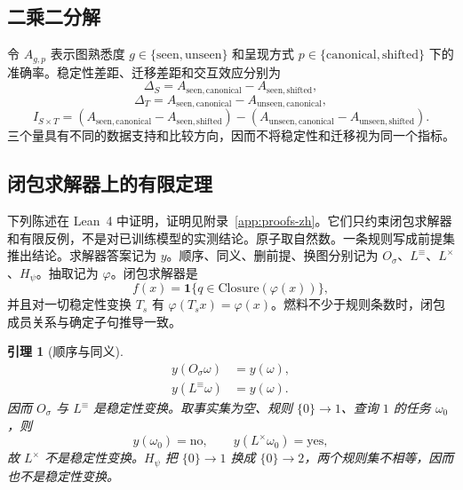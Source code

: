 \documentclass[UTF8,11pt,a4paper]{ctexart}
\theoremstyle{plain}
\newtheorem{lemma}[theorem]{引理}
\begin{document}
\subsection{二乘二分解}

令 $A_{g,p}$ 表示图熟悉度 $g\in\{\mathrm{seen},\mathrm{unseen}\}$ 和呈现方式 $p\in\{\mathrm{canonical},\mathrm{shifted}\}$ 下的准确率。稳定性差距、迁移差距和交互效应分别为
\begin{equation}
\Delta_S=A_{\mathrm{seen,canonical}}-A_{\mathrm{seen,shifted}},
\end{equation}
\begin{equation}
\Delta_T=A_{\mathrm{seen,canonical}}-A_{\mathrm{unseen,canonical}},
\end{equation}
\begin{equation}
I_{S\times T}=
\left(A_{\mathrm{seen,canonical}}-A_{\mathrm{seen,shifted}}\right)
-\left(A_{\mathrm{unseen,canonical}}-A_{\mathrm{unseen,shifted}}\right).
\end{equation}
三个量具有不同的数据支持和比较方向，因而不将稳定性和迁移视为同一个指标。

\subsection{闭包求解器上的有限定理}

下列陈述在 Lean~4 中证明，证明见附录~\ref{app:proofs-zh}。它们只约束闭包求解器和有限反例，不是对已训练模型的实测结论。原子取自然数。一条规则写成前提集推出结论。求解器答案记为 $y$。顺序、同义、删前提、换图分别记为 $O_\sigma$、$L^{\equiv}$、$L^{\times}$、$H_\psi$。抽取记为 $\varphi$。闭包求解器是
\begin{equation}
f(x)=\mathbf{1}\{q\in\mathrm{Closure}(\varphi(x))\},
\end{equation}
并且对一切稳定性变换 $T_s$ 有 $\varphi(T_sx)=\varphi(x)$。燃料不少于规则条数时，闭包成员关系与确定子句推导一致。

\begin{lemma}[顺序与同义]
\label{lem:order-zh}
\begin{align}
y(O_\sigma\omega)&=y(\omega),\\
y(L^{\equiv}\omega)&=y(\omega).
\end{align}
因而 $O_\sigma$ 与 $L^{\equiv}$ 是稳定性变换。取事实集为空、规则 $\{0\}\to 1$、查询 $1$ 的任务 $\omega_0$，则
\begin{equation}
y(\omega_0)=\mathrm{no},\qquad y(L^{\times}\omega_0)=\mathrm{yes},
\end{equation}
故 $L^{\times}$ 不是稳定性变换。$H_\psi$ 把 $\{0\}\to 1$ 换成 $\{0\}\to 2$，两个规则集不相等，因而也不是稳定性变换。
\end{lemma}
\end{document}
